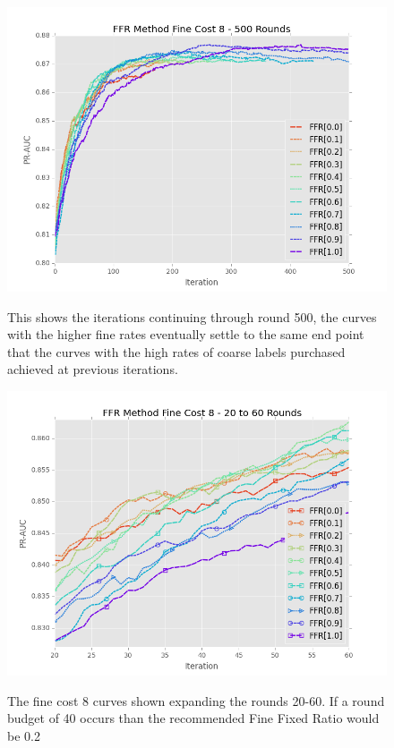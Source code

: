 \documentclass[ms]{nuthesis}
\begin{document}
\FloatBarrier
\begin{figure}[!htb]
	\centering
    \includegraphics[width=1.0\columnwidth]{fig/ParamsFFR_PR_Cost8_rnds0_500}
    \label{fig:ParamsFFR_PR_Cost8_rnds0_500}
    \caption{This shows the iterations continuing through round 500, the curves
    with the higher fine rates eventually settle to the same end point that the
    curves with the high rates of coarse labels purchased achieved at previous
    iterations.}
\end{figure}
\FloatBarrier

\FloatBarrier
\begin{figure}[!htb]
	\centering
    \includegraphics[width=1.0\columnwidth]{fig/ParamsFFR_PR_Cost8_rnds20_60}
    \label{fig:ParamsFFR_PR_Cost8_rnds20_60}
    \caption{The fine cost 8 curves shown expanding the rounds 20-60. If a round budget of 40
    occurs than the recommended Fine Fixed Ratio would be 0.2}
\end{figure}
\FloatBarrier
\end{document}
